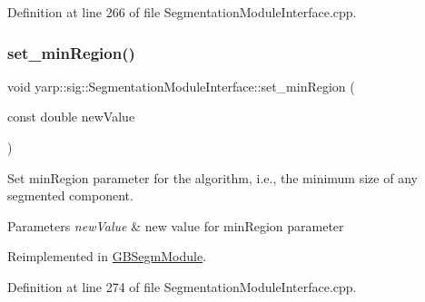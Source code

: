 Definition at line 266 of file Segmentation\+Module\+Interface.\+cpp.


\begin{DoxyCode}{0}

\end{DoxyCode}
\mbox{\label{classyarp_1_1sig_1_1SegmentationModuleInterface_ad9d90ed7e362ae83e2145445a9c4301e}} 
\subsubsection{\texorpdfstring{set\_minRegion()}{set\_minRegion()}}
{\footnotesize\ttfamily void yarp\+::sig\+::\+Segmentation\+Module\+Interface\+::set\+\_\+min\+Region (\begin{DoxyParamCaption}\item[{const double}]{new\+Value }\end{DoxyParamCaption})\hspace{0.3cm}{\ttfamily [virtual]}}



Set min\+Region parameter for the algorithm, i.\+e., the minimum size of any segmented component. 


\begin{DoxyParams}{Parameters}
{\em new\+Value} & new value for min\+Region parameter \\
\hline
\end{DoxyParams}


Reimplemented in \mbox{\hyperlink{classGBSegmModule_ae1c722c9c774cbde4f6bfada3f0826ba}{G\+B\+Segm\+Module}}.



Definition at line 274 of file Segmentation\+Module\+Interface.\+cpp.


